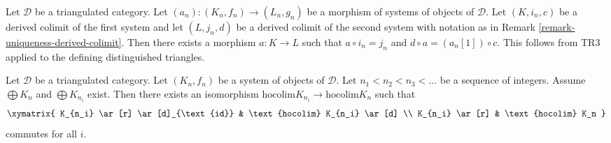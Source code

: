 \begin{remark}
\label{remark-functoriality-derived-colimit}
Let $\mathcal{D}$ be a triangulated category.
Let $(a_n) : (K_n, f_n) \to (L_n, g_n)$ be a morphism of systems
of objects of $\mathcal{D}$. Let $(K, i_n, c)$ be a derived
colimit of the first system and let $(L, j_n, d)$ be a derived
colimit of the second system with notation as in
Remark \ref{remark-uniqueness-derived-colimit}.
Then there exists a morphism $a : K \to L$
such that $a \circ i_n = j_n$ and $d \circ a = (a_n[1]) \circ c$.
This follows from TR3 applied to the defining distinguished
triangles.
\end{remark}

\begin{lemma}
\label{lemma-hocolim-subsequence}
Let $\mathcal{D}$ be a triangulated category.
Let $(K_n, f_n)$ be a system of objects of $\mathcal{D}$.
Let $n_1 < n_2 < n_3 < \ldots$ be a sequence of integers.
Assume $\bigoplus K_n$ and $\bigoplus K_{n_i}$ exist.
Then there exists an isomorphism
$\text{hocolim} K_{n_i} \to \text{hocolim} K_n$
such that
$$
\xymatrix{
K_{n_i} \ar[r] \ar[d]_{\text{id}} & \text{hocolim} K_{n_i} \ar[d] \\
K_{n_i} \ar[r] & \text{hocolim} K_n
}
$$
commutes for all $i$.
\end{lemma}

